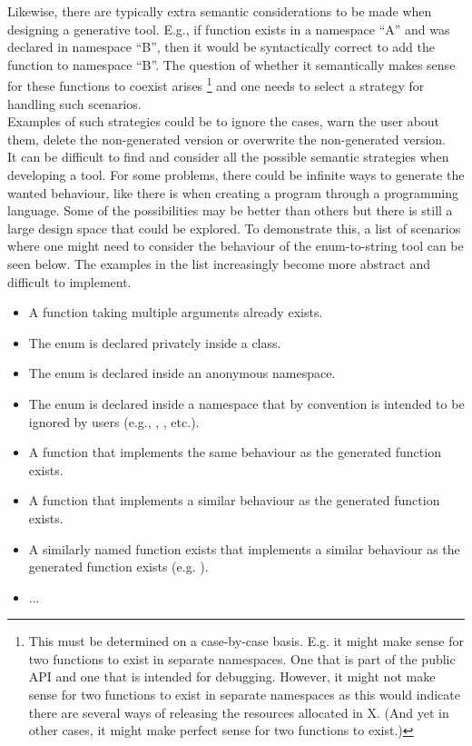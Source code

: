 Likewise, there are typically extra semantic considerations to be made when designing a generative tool. E.g., if  function exists in a namespace ``A'' and  was declared in namespace ``B'', then it would be syntactically correct to add the  function to namespace ``B''. The question of whether it semantically makes sense for these functions to coexist arises
\footnote{This must be determined on a case-by-case basis. E.g. it might make sense for two  functions to exist in separate namespaces. One that is part of the public API and one that is intended for debugging. However, it might not make sense for two  functions to exist in separate namespaces as this would indicate there are several ways of releasing the resources allocated in X. (And yet in other cases, it might make perfect sense for two  functions to exist.)}
and one needs to select a strategy for handling such scenarios.\\
Examples of such strategies could be to ignore the cases, warn the user about them, delete the non-generated version or overwrite the non-generated version.\\
It can be difficult to find and consider all the possible semantic strategies when developing a tool. For some problems, there could be infinite ways to generate the wanted behaviour, like there is when creating a program through a programming language. Some of the possibilities may be better than others but there is still a large design space that could be explored.
To demonstrate this, a list of scenarios where one might need to consider the behaviour of the enum-to-string tool can be seen below. The examples in the list increasingly become more abstract and difficult to implement.

\begin{itemize}
    \vspace{-0.75em}
    \item A  function taking multiple arguments already exists.
    \item The enum is declared privately inside a class.
    \item The enum is declared inside an anonymous namespace.
    \item The enum is declared inside a namespace that by convention is intended to be ignored by users (e.g., , , etc.).
    \item A function that implements the same behaviour as the generated  function exists.
    \item A function that implements a similar behaviour as the generated  function exists.
    \item A similarly named function exists that implements a similar behaviour as the generated  function exists (e.g. ).
    \item ...
\end{itemize}

